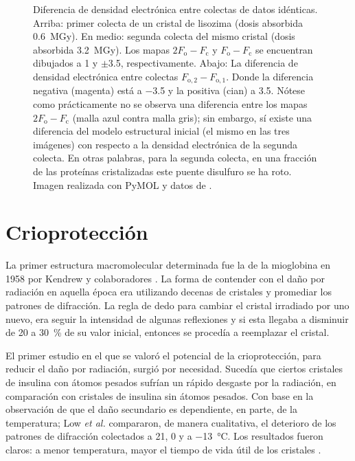 \begin{figure}[hb]
	\caption[Diferencia de densidad electrónica]{Diferencia de densidad electrónica entre colectas de datos idénticas. Arriba: primer colecta de un cristal de lisozima (dosis absorbida \SI{0.6}{\mega\gray}). En medio: segunda colecta del mismo cristal (dosis absorbida \SI{3.2}{\mega\gray}). Los mapas $2F_{\mathrm{o}}-F_{\mathrm{c}}$ y $F_{\mathrm{o}}-F_{\mathrm{c}}$ se encuentran dibujados a \SI{1}{\sigma} y $\pm$\SI{3.5}{\sigma}, respectivamente. Abajo: La diferencia de densidad electrónica entre colectas $F_{\mathrm{o,2}}-F_{\mathrm{o,1}}$. Donde la diferencia negativa (magenta) está a \SI{-3.5}{\sigma} y la positiva (cian) a \SI{3.5}{\sigma}. Nótese como prácticamente no se observa una diferencia entre los mapas $2F_{\mathrm{o}}-F_{\mathrm{c}}$ (malla azul contra malla gris); sin embargo, sí existe una diferencia del modelo estructural inicial (el mismo en las tres imágenes) con respecto a la densidad electrónica de la segunda colecta. En otras palabras, para la segunda colecta, en una fracción de las proteínas cristalizadas este puente disulfuro se ha roto. Imagen realizada con PyMOL \cite{pymol} y datos de \cite{Nanao2005}. }
\end{figure}


\section{Crioprotección}
La primer estructura macromolecular determinada fue la de la mioglobina en 1958 por Kendrew y colaboradores . La forma de contender con el daño por radiación en aquella época era utilizando decenas de cristales y promediar los patrones de difracción. La regla de dedo para cambiar el cristal irradiado por uno nuevo, era seguir la intensidad de algunas reflexiones y si esta llegaba a disminuir de \num{20} a \SI{30}{\percent} de su valor inicial, entonces se procedía a reemplazar el cristal. 

El primer estudio en el que se valoró el potencial de la crioprotección, para reducir el daño por radiación, surgió por necesidad. Sucedía que ciertos cristales de insulina con átomos pesados sufrían un rápido desgaste por la radiación, en comparación con cristales de insulina sin átomos pesados. Con base en la observación de que el daño secundario es dependiente, en parte, de la temperatura; Low \emph{et al.} compararon, de manera cualitativa, el deterioro de los patrones de difracción colectados a \num{21}, \num{0} y a \SI{-13}{\celsius}. Los resultados fueron claros: a menor temperatura, mayor el tiempo de vida útil de los cristales  . 

